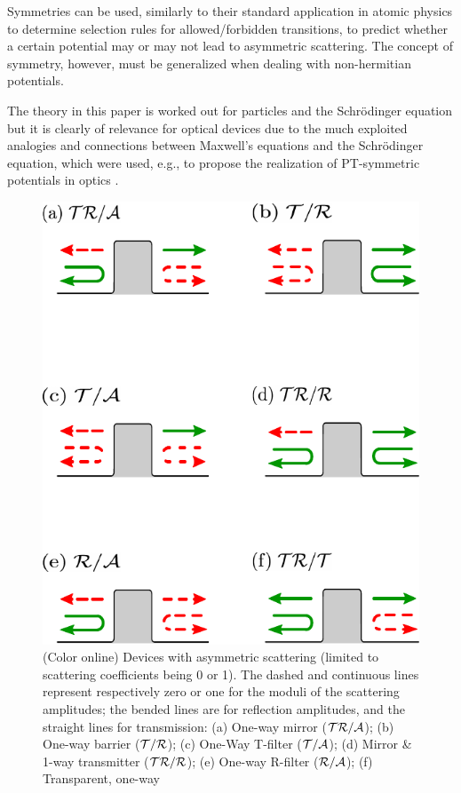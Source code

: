 Symmetries can be used, similarly to their standard application in atomic physics to determine selection rules for allowed/forbidden
transitions,
to predict whether a certain potential may or may not lead to asymmetric
scattering. The concept of symmetry, however, must be generalized when dealing with non-hermitian potentials.

The theory in this paper is worked out for particles and the Schr\"odinger equation but it is clearly of relevance for optical devices
due to the much exploited analogies and connections between Maxwell's equations and the Schr\"odinger equation,
which were used, e.g., to propose  the realization of PT-symmetric potentials in optics \cite{Ruschhaupt2005}.


\begin{figure}
\includegraphics[width = 0.9\columnwidth]{Figures/PotentialCasesPT.pdf}
\caption{(Color online) Devices with asymmetric scattering (limited to scattering coefficients being 0 or 1).  The dashed and continuous lines represent respectively zero or one
for the moduli of the scattering amplitudes; the bended lines are for reflection amplitudes, and the straight lines for transmission:
(a) One-way mirror ($\cal{TR/A}$); (b) One-way barrier ($\cal{T/R}$); (c) One-Way T-filter ($\cal{T/A}$);
(d) Mirror \& 1-way transmitter ($\cal{TR/R}$); (e) One-way R-filter ($\cal{R/A}$); (f) Transparent, one-way
}
\end{figure}
